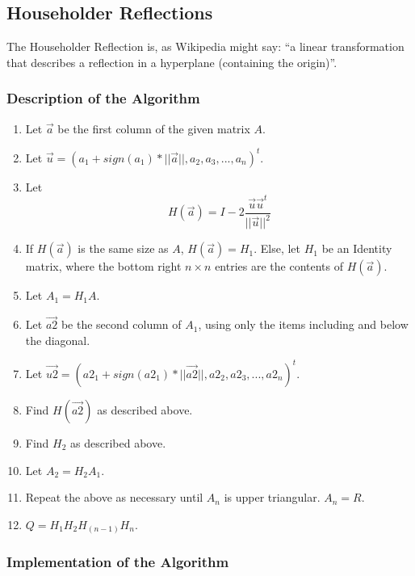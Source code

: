 \documentclass[letterpaper,12pt]{article}
\begin{document}
\subsection{Householder Reflections}

The Householder Reflection is, as Wikipedia might say: ``a linear transformation
that describes a reflection in a hyperplane (containing the origin)''.

\subsubsection{Description of the Algorithm}

\begin{enumerate}
\item Let $\vec{a}$ be the first column of the given matrix $A$.
\item Let $\vec{u} = (a_1 + sign(a_1) * ||\vec{a}||, a_2, a_3, ..., a_n)^t$.
\item Let \[H(\vec{a}) = I - 2 \frac{\vec{u}\vec{u}^t}{||\vec{u}||^2}\]
\item If $H(\vec{a})$ is the same size as $A$, $H(\vec{a}) = H_1$.
  Else, let $H_1$ be an Identity matrix, where the bottom right $n \times n$
  entries are the contents of $H(\vec{a})$.
\item Let $A_1 = H_1 A$.
\item Let $\vec{a2}$ be the second column of $A_1$, using only the items including
  and below the diagonal.
\item Let $\vec{u2} = (a2_1 + sign(a2_1) * ||\vec{a2}||, a2_2, a2_3, ..., a2_n)^t$.
\item Find $H(\vec{a2})$ as described above.
\item Find $H_2$ as described above.
\item Let $A_2 = H_2 A_1$.
\item Repeat the above as necessary until $A_n$ is upper triangular. $A_n = R$.
\item $Q = H_1 H_2 H_{(n-1)} H_n$.
\end{enumerate}

\subsubsection{Implementation of the Algorithm}
\end{document}
